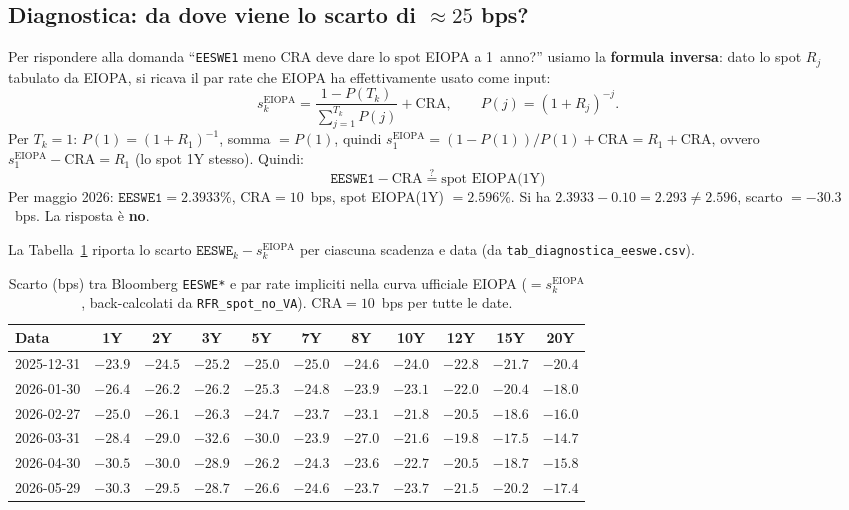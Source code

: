 \documentclass[11pt,a4paper]{article}
\theoremstyle{plain}
\theoremstyle{definition}
\theoremstyle{remark}
\newcommand{\CRA}{\mathrm{CRA}}
\begin{document}
\subsection{Diagnostica: da dove viene lo scarto di $\approx 25$ bps?}
\label{sec:validazione-diagn}

Per rispondere alla domanda ``\texttt{EESWE1} meno CRA deve dare lo spot EIOPA a 1~anno?''
usiamo la \textbf{formula inversa}: dato lo spot $R_j$ tabulato da EIOPA, si ricava il
par rate che EIOPA ha effettivamente usato come input:
\[
  s_k^{\text{EIOPA}} = \frac{1 - P(T_k)}{\displaystyle\sum_{j=1}^{T_k} P(j)} + \CRA,
  \qquad P(j) = (1 + R_j)^{-j}.
\]
Per $T_k = 1$: $P(1) = (1+R_1)^{-1}$, somma $= P(1)$, quindi
$s_1^{\text{EIOPA}} = (1-P(1))/P(1) + \CRA = R_1 + \CRA$, ovvero
$s_1^{\text{EIOPA}} - \CRA = R_1$ (lo spot 1Y stesso). Quindi:
\[
  \boxed{\;\texttt{EESWE1} - \CRA \stackrel{?}{=} \text{spot EIOPA(1Y)}\;}
\]
Per maggio 2026: $\texttt{EESWE1} = 2.3933\%$, $\CRA = 10$~bps,
spot EIOPA(1Y) $= 2.596\%$. Si ha $2.3933 - 0.10 = 2.293 \ne 2.596$, scarto $= -30.3$~bps.
La risposta \`e \textbf{no}.

La Tabella~\ref{tab:diagn} riporta lo scarto $\texttt{EESWE}_k - s_k^{\text{EIOPA}}$ per
ciascuna scadenza e data (da \texttt{tab\_diagnostica\_eeswe.csv}).

\begin{table}[H]
\centering\footnotesize
\caption{Scarto (bps) tra Bloomberg \texttt{EESWE*} e par rate impliciti nella curva
ufficiale EIOPA ($= s_k^{\text{EIOPA}}$, back-calcolati da \texttt{RFR\_spot\_no\_VA}).
$\CRA = 10$~bps per tutte le date.}
\label{tab:diagn}
\renewcommand{\arraystretch}{1.2}
\setlength{\tabcolsep}{4pt}
\begin{tabular}{lcccccccccc}
\toprule
\textbf{Data} & 1Y & 2Y & 3Y & 5Y & 7Y & 8Y & 10Y & 12Y & 15Y & 20Y\\
\midrule
\rowcolor{rowtint}2025-12-31 & $-23.9$ & $-24.5$ & $-25.2$ & $-25.0$ & $-25.0$ & $-24.6$ & $-24.0$ & $-22.8$ & $-21.7$ & $-20.4$\\
2026-01-30 & $-26.4$ & $-26.2$ & $-26.2$ & $-25.3$ & $-24.8$ & $-23.9$ & $-23.1$ & $-22.0$ & $-20.4$ & $-18.0$\\
\rowcolor{rowtint}2026-02-27 & $-25.0$ & $-26.1$ & $-26.3$ & $-24.7$ & $-23.7$ & $-23.1$ & $-21.8$ & $-20.5$ & $-18.6$ & $-16.0$\\
2026-03-31 & $-28.4$ & $-29.0$ & $-32.6$ & $-30.0$ & $-23.9$ & $-27.0$ & $-21.6$ & $-19.8$ & $-17.5$ & $-14.7$\\
\rowcolor{rowtint}2026-04-30 & $-30.5$ & $-30.0$ & $-28.9$ & $-26.2$ & $-24.3$ & $-23.6$ & $-22.7$ & $-20.5$ & $-18.7$ & $-15.8$\\
2026-05-29 & $-30.3$ & $-29.5$ & $-28.7$ & $-26.6$ & $-24.6$ & $-23.7$ & $-23.7$ & $-21.5$ & $-20.2$ & $-17.4$\\
\bottomrule
\end{tabular}
\end{table}
\end{document}
